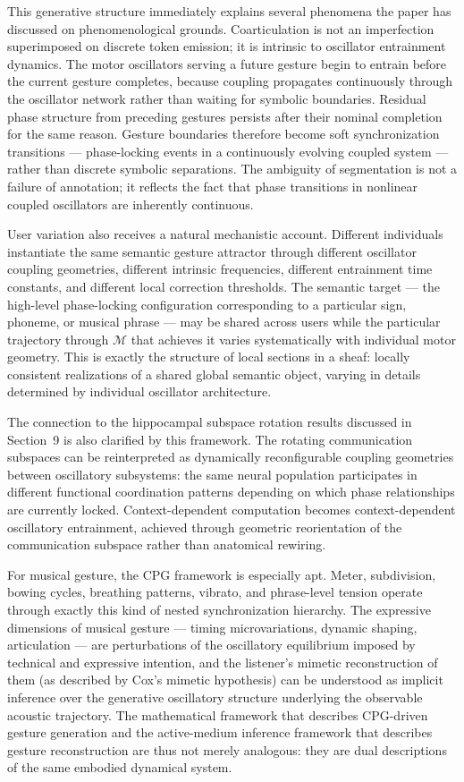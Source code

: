 \documentclass[11pt, a4paper]{article}
\theoremstyle{definition}
\begin{document}
This generative structure immediately explains several phenomena the paper has discussed on phenomenological grounds. Coarticulation is not an imperfection superimposed on discrete token emission; it is intrinsic to oscillator entrainment dynamics. The motor oscillators serving a future gesture begin to entrain before the current gesture completes, because coupling propagates continuously through the oscillator network rather than waiting for symbolic boundaries. Residual phase structure from preceding gestures persists after their nominal completion for the same reason. Gesture boundaries therefore become soft synchronization transitions --- phase-locking events in a continuously evolving coupled system --- rather than discrete symbolic separations. The ambiguity of segmentation is not a failure of annotation; it reflects the fact that phase transitions in nonlinear coupled oscillators are inherently continuous.

User variation also receives a natural mechanistic account. Different individuals instantiate the same semantic gesture attractor through different oscillator coupling geometries, different intrinsic frequencies, different entrainment time constants, and different local correction thresholds. The semantic target --- the high-level phase-locking configuration corresponding to a particular sign, phoneme, or musical phrase --- may be shared across users while the particular trajectory through $\mathcal{M}$ that achieves it varies systematically with individual motor geometry. This is exactly the structure of local sections in a sheaf: locally consistent realizations of a shared global semantic object, varying in details determined by individual oscillator architecture.

The connection to the hippocampal subspace rotation results discussed in Section~9 is also clarified by this framework. The rotating communication subspaces can be reinterpreted as dynamically reconfigurable coupling geometries between oscillatory subsystems: the same neural population participates in different functional coordination patterns depending on which phase relationships are currently locked. Context-dependent computation becomes context-dependent oscillatory entrainment, achieved through geometric reorientation of the communication subspace rather than anatomical rewiring.

For musical gesture, the CPG framework is especially apt. Meter, subdivision, bowing cycles, breathing patterns, vibrato, and phrase-level tension operate through exactly this kind of nested synchronization hierarchy. The expressive dimensions of musical gesture --- timing microvariations, dynamic shaping, articulation --- are perturbations of the oscillatory equilibrium imposed by technical and expressive intention, and the listener's mimetic reconstruction of them (as described by Cox's mimetic hypothesis) can be understood as implicit inference over the generative oscillatory structure underlying the observable acoustic trajectory. The mathematical framework that describes CPG-driven gesture generation and the active-medium inference framework that describes gesture reconstruction are thus not merely analogous: they are dual descriptions of the same embodied dynamical system.
\end{document}
